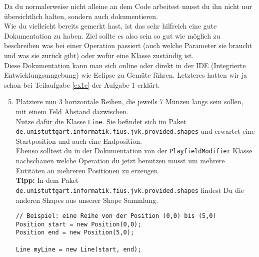 \begin{Infobox}
    Da du normalerweise nicht alleine an dem Code arbeitest musst du ihn nicht nur übersichtlich halten, sondern auch dokumentieren.\\
    Wie du vielleicht bereits gemerkt hast, ist das sehr hilfreich eine gute Dokumentation zu haben.
    Ziel sollte es also sein so gut wie möglich zu beschreiben was bei einer Operation passiert (auch welche Parameter sie braucht und was sie zurück gibt) oder wofür eine Klasse zuständig ist.\\

    Diese Dokumentation kann man sich online oder direkt in der IDE (Integrierte Entwicklungsumgebung) wie Eclipse zu Gemüte führen. Letzteres hatten wir ja schon bei Teilaufgabe \ref{ex1e} der Aufgabe 1 erklärt.
\end{Infobox}


\begin{enumerate}
	\setcounter{enumi}{4}
    \item Platziere nun 3 horizontale Reihen, die jeweils 7 Münzen langs sein sollen, mit einem Feld Abstand dazwischen.\\
	Nutze dafür die Klasse \lstinline{Line}. Sie befindet sich im Paket \texttt{de.unistuttgart.informatik.fius.jvk.provided.shapes} und erwartet eine Startposition und auch eine Endposition.\\
    Ebenso solltest du in der Dokumentation von der \lstinline{PlayfieldModifier} Klasse nachschauen welche Operation du jetzt benutzen musst um mehrere Entitäten an mehreren Positionen zu erzeugen.\\
	\textbf{Tipp:} In dem Paket \texttt{de.unistuttgart.informatik.fius.jvk.provided.shapes} findest Du die anderen Shapes aus unserer Shape Sammlung.

    \begin{lstlisting}
// Beispiel: eine Reihe von der Position (0,0) bis (5,0)
Position start = new Position(0,0);
Position end = new Position(5,0);

Line myLine = new Line(start, end);
    \end{lstlisting}

\end{enumerate}
